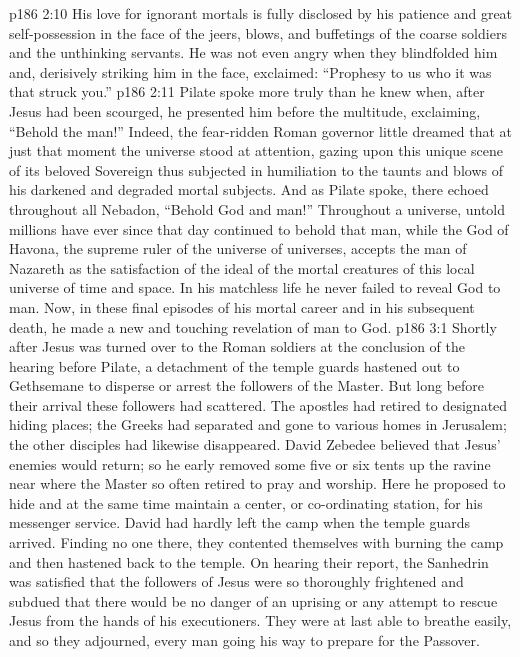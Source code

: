 \vs p186 2:10 His love for ignorant mortals is fully disclosed by his patience and great self\hyp{}possession in the face of the jeers, blows, and buffetings of the coarse soldiers and the unthinking servants. He was not even angry when they blindfolded him and, derisively striking him in the face, exclaimed: “Prophesy to us who it was that struck you.”
\vs p186 2:11 Pilate spoke more truly than he knew when, after Jesus had been scourged, he presented him before the multitude, exclaiming, “Behold the man!” Indeed, the fear\hyp{}ridden Roman governor little dreamed that at just that moment the universe stood at attention, gazing upon this unique scene of its beloved Sovereign thus subjected in humiliation to the taunts and blows of his darkened and degraded mortal subjects. And as Pilate spoke, there echoed throughout all Nebadon, “Behold God and man!” Throughout a universe, untold millions have ever since that day continued to behold that man, while the God of Havona, the supreme ruler of the universe of universes, accepts the man of Nazareth as the satisfaction of the ideal of the mortal creatures of this local universe of time and space. In his matchless life he never failed to reveal God to man. Now, in these final episodes of his mortal career and in his subsequent death, he made a new and touching revelation of man to God.
\vs p186 3:1 Shortly after Jesus was turned over to the Roman soldiers at the conclusion of the hearing before Pilate, a detachment of the temple guards hastened out to Gethsemane to disperse or arrest the followers of the Master. But long before their arrival these followers had scattered. The apostles had retired to designated hiding places; the Greeks had separated and gone to various homes in Jerusalem; the other disciples had likewise disappeared. David Zebedee believed that Jesus’ enemies would return; so he early removed some five or six tents up the ravine near where the Master so often retired to pray and worship. Here he proposed to hide and at the same time maintain a center, or co\hyp{}ordinating station, for his messenger service. David had hardly left the camp when the temple guards arrived. Finding no one there, they contented themselves with burning the camp and then hastened back to the temple. On hearing their report, the Sanhedrin was satisfied that the followers of Jesus were so thoroughly frightened and subdued that there would be no danger of an uprising or any attempt to rescue Jesus from the hands of his executioners. They were at last able to breathe easily, and so they adjourned, every man going his way to prepare for the Passover.

